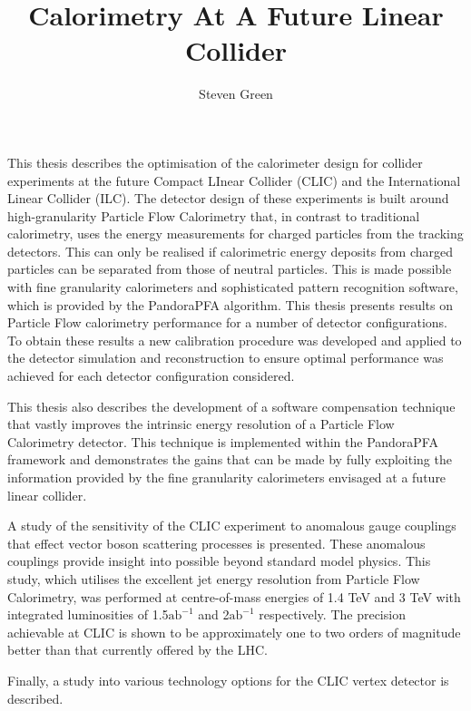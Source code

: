 \documentclass{article}
\begin{document}
\title{Calorimetry At A Future Linear Collider}
\author{Steven Green}
\date{}
\maketitle



This thesis describes the optimisation of the calorimeter design for collider experiments
at the future Compact LInear Collider (CLIC) and the International Linear Collider (ILC). 
The detector design of these experiments is built around high-granularity Particle Flow Calorimetry
that, in contrast to traditional calorimetry, uses the energy measurements for charged particles from 
the tracking detectors. This can only be realised if calorimetric energy deposits from
charged particles can be separated from those of neutral particles. This is made possible with fine
granularity calorimeters and sophisticated pattern recognition software, which is provided by the
PandoraPFA algorithm. This thesis presents results on Particle Flow calorimetry performance for a number
of detector configurations. To obtain these results a new calibration procedure was developed 
and applied to the detector simulation and reconstruction to ensure optimal performance 
was achieved for each detector configuration considered.

This thesis also describes the development of a software compensation technique that vastly improves the
intrinsic energy resolution of a Particle Flow Calorimetry detector. This technique is implemented
within the PandoraPFA framework and demonstrates the gains that can be made by fully exploiting
the information provided by the fine granularity calorimeters envisaged at a future linear collider.

A study of the sensitivity of the CLIC experiment to anomalous gauge couplings that
effect vector boson scattering processes is presented. These anomalous couplings provide insight
into possible beyond standard model physics. This study, which utilises the excellent jet energy resolution from
Particle Flow Calorimetry, was performed at centre-of-mass energies of 1.4 TeV and 3 TeV with integrated 
luminosities of 1.5$\text{ab}^{-1}$ and 2$\text{ab}^{-1}$ respectively. The precision achievable at CLIC is shown to be approximately 
one to two orders of magnitude better than that currently offered by the LHC.

Finally, a study into various technology options for the CLIC vertex detector is described.
\end{document}
